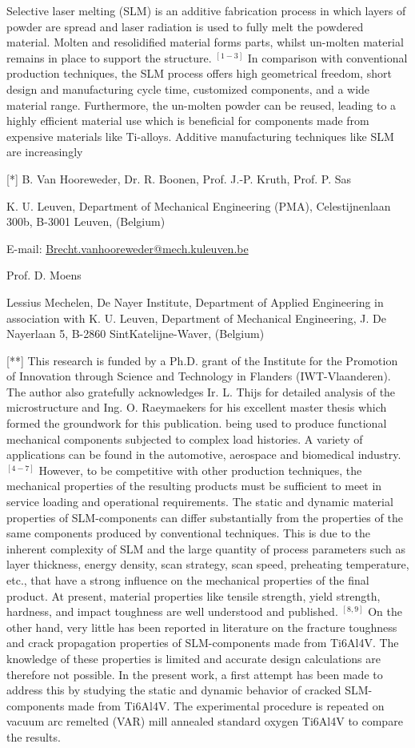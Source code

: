 \documentclass[10pt]{article}
\begin{document}
Selective laser melting (SLM) is an additive fabrication process in which layers of powder are spread and laser radiation is used to fully melt the powdered material. Molten and resolidified material forms parts, whilst un-molten material remains in place to support the structure. ${ }^{[1-3]}$ In comparison with conventional production techniques, the SLM process offers high geometrical freedom, short design and manufacturing cycle time, customized components, and a wide material range. Furthermore, the un-molten powder can be reused, leading to a highly efficient material use which is beneficial for components made from expensive materials like Ti-alloys. Additive manufacturing techniques like SLM are increasingly

[*] B. Van Hooreweder, Dr. R. Boonen, Prof. J.-P. Kruth, Prof. P. Sas

K. U. Leuven, Department of Mechanical Engineering (PMA), Celestijnenlaan 300b, B-3001 Leuven, (Belgium)

E-mail: \href{mailto:Brecht.vanhooreweder@mech.kuleuven.be}{Brecht.vanhooreweder@mech.kuleuven.be}

Prof. D. Moens

Lessius Mechelen, De Nayer Institute, Department of Applied Engineering in association with K. U. Leuven, Department of Mechanical Engineering, J. De Nayerlaan 5, B-2860 SintKatelijne-Waver, (Belgium)

[**] This research is funded by a Ph.D. grant of the Institute for the Promotion of Innovation through Science and Technology in Flanders (IWT-Vlaanderen). The author also gratefully acknowledges Ir. L. Thijs for detailed analysis of the microstructure and Ing. O. Raeymaekers for his excellent master thesis which formed the groundwork for this publication. being used to produce functional mechanical components subjected to complex load histories. A variety of applications can be found in the automotive, aerospace and biomedical industry. ${ }^{[4-7]}$ However, to be competitive with other production techniques, the mechanical properties of the resulting products must be sufficient to meet in service loading and operational requirements. The static and dynamic material properties of SLM-components can differ substantially from the properties of the same components produced by conventional techniques. This is due to the inherent complexity of SLM and the large quantity of process parameters such as layer thickness, energy density, scan strategy, scan speed, preheating temperature, etc., that have a strong influence on the mechanical properties of the final product. At present, material properties like tensile strength, yield strength, hardness, and impact toughness are well understood and published. ${ }^{[8,9]}$ On the other hand, very little has been reported in literature on the fracture toughness and crack propagation properties of SLM-components made from Ti6Al4V. The knowledge of these properties is limited and accurate design calculations are therefore not possible. In the present work, a first attempt has been made to address this by studying the static and dynamic behavior of cracked SLM-components made from Ti6Al4V. The experimental procedure is repeated on vacuum arc remelted (VAR) mill annealed standard oxygen Ti6Al4V to compare the results.
\end{document}
